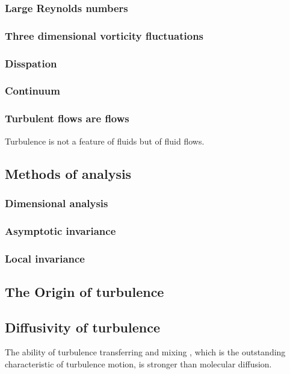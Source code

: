 \documentclass[review]{elsarticle}
\begin{document}
		\subsubsection {Large Reynolds numbers}
		\subsubsection {Three dimensional vorticity fluctuations}
		\subsubsection {Disspation}
		\subsubsection {Continuum}
		\subsubsection {Turbulent flows are flows}
			Turbulence is not a feature of fluids but of fluid flows.
	\subsection{Methods of analysis}
		\subsubsection {Dimensional analysis}
		\subsubsection {Asymptotic invariance}
		\subsubsection {Local invariance}
	\subsection{The Origin of turbulence}
	\subsection{Diffusivity of turbulence}
		The ability of turbulence transferring and mixing , which is the outstanding characteristic of turbulence motion, 
		is stronger than molecular diffusion.
\end{document}
